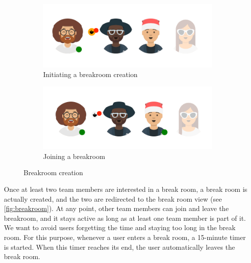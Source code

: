 \begin{figure}[h]
    \centering
    \begin{subfigure}{.5\textwidth}
        \centering
        \includegraphics[width=.8\linewidth]{./images/breakroom_initiator.png}
        \caption{Initiating a breakroom creation }
        \label{fig:breakroom_initiator}
    \end{subfigure}%
    \begin{subfigure}{.5\textwidth}
        \centering
        \includegraphics[width=.8\linewidth]{./images/breakroom_indicator.png}
        \caption{Joining a breakroom }
        \label{fig:breakroom_indicator}
    \end{subfigure}
    \caption{Breakroom creation}
\end{figure}


Once at least two team members are interested in a break room, a break room is actually created, and the two are redirected to the break room view (see \autoref{fig:breakroom}). At any point, other team members can join and leave the breakroom, and it stays active as long as at least one team member is part of it. We want to avoid users forgetting the time and staying too long in the break room. For this purpose, whenever a user enters a break room, a 15-minute timer is started. When this timer reaches its end, the user automatically leaves the break room.

